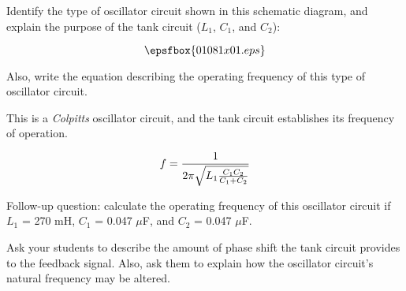 

Identify the type of oscillator circuit shown in this schematic diagram, and explain the purpose of the tank circuit ($L_1$, $C_1$, and $C_2$):

$$\epsfbox{01081x01.eps}$$

Also, write the equation describing the operating frequency of this type of oscillator circuit.







This is a {\it Colpitts} oscillator circuit, and the tank circuit establishes its frequency of operation.

$$f = {1 \over {2 \pi \sqrt{L_1 {C_1 C_2 \over C_1 + C_2}}}}$$

\vskip 10pt

Follow-up question: calculate the operating frequency of this oscillator circuit if $L_1$ = 270 mH, $C_1$ = 0.047 $\mu$F, and $C_2$ = 0.047 $\mu$F.







Ask your students to describe the amount of phase shift the tank circuit provides to the feedback signal.  Also, ask them to explain how the oscillator circuit's natural frequency may be altered.




